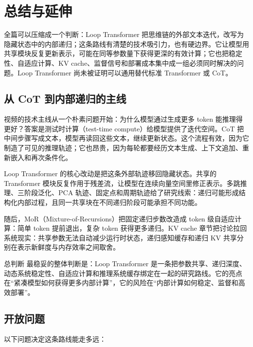 \section{总结与延伸}
\label{sec:synthesis}

全篇可以压缩成一个判断：Loop Transformer 把思维链的外部文本迭代，改写为隐藏状态中的内部递归；这条路线有清楚的技术吸引力，也有硬边界。它让模型用共享模块反复更新表示，可能在同等参数量下获得更深的有效计算；它也把稳定性、自适应计算、KV cache、监督信号和部署成本集中成一组必须同时解决的问题。Loop Transformer 尚未被证明可以通用替代标准 Transformer 或 CoT。

\subsection{从 CoT 到内部递归的主线}

视频的技术主线从一个朴素问题开始：为什么模型通过生成更多 token 能推理得更好？答案是测试时计算（test-time compute）给模型提供了迭代空间。CoT 把中间步骤写成文本，模型再读回这些文本，继续更新状态。这个流程有效，因为它制造了可见的推理轨迹；它也昂贵，因为每轮都要经历文本生成、上下文追加、重新嵌入和再次条件化。

Loop Transformer 的核心改动是把这条外部轨迹移回隐藏状态。共享的 Transformer 模块反复作用于残差流，让模型在连续向量空间里修正表示。多跳推理、三阶段泛化、PCA 轨迹、固定点和周期轨迹给了研究线索：递归可能形成结构化内部过程，且同一共享块在不同递归阶段可能承担不同功能。

随后，MoR（Mixture-of-Recursions）把固定递归步数改造成 token 级自适应计算：简单 token 提前退出，复杂 token 获得更多递归。KV cache 章节把讨论拉回系统现实：共享参数无法自动减少运行时状态，递归感知缓存和递归 KV 共享分别在表示新鲜度与内存效率之间取舍。

\begin{importantbox}{总判断}
最稳妥的整体判断是：Loop Transformer 是一条把参数共享、递归深度、动态系统稳定性、自适应计算和推理系统缓存绑定在一起的研究路线。它的亮点在“紧凑模型如何获得更多内部计算”，它的风险在“内部计算如何稳定、监督和高效部署”。
\end{importantbox}

\subsection{开放问题}

以下问题决定这条路线能走多远：

